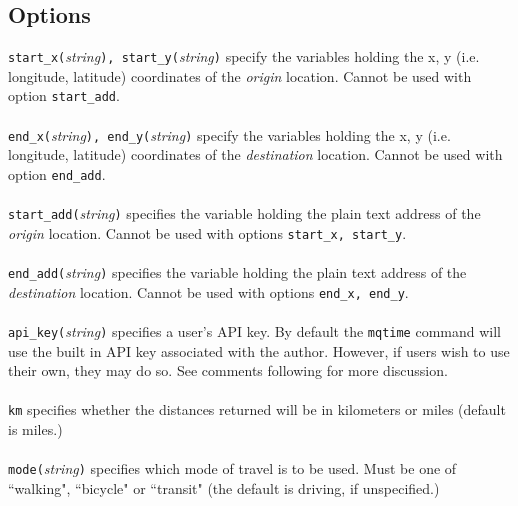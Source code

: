 \documentclass[11pt]{article}
\begin{document}
\subsection{Options}
\verb|start_x(|\textit{string}\verb|), start_y(|\textit{string}\verb|)| specify the variables holding the x, y (i.e. longitude, latitude) coordinates of the \textit{origin} location. Cannot be used with option \verb|start_add|.
\\ \\
\verb|end_x(|\textit{string}\verb|), end_y(|\textit{string}\verb|)| specify the variables holding the x, y (i.e. longitude, latitude) coordinates of the \textit{destination} location. Cannot be used with option \verb|end_add|.
\\ \\
\verb|start_add(|\textit{string}\verb|)| specifies the variable holding the plain text address of the \textit{origin} location. Cannot be used with options \verb|start_x, start_y|.
\\ \\
\verb|end_add(|\textit{string}\verb|)| specifies the variable holding the plain text address of the \textit{destination} location. Cannot be used with options \verb|end_x, end_y|.
\\ \\
\verb|api_key(|\textit{string}\verb|)| specifies a user's API key. By default the \verb|mqtime| command will use the built in API key associated with the author. However, if users wish to use their own, they may do so. See comments following for more discussion.
\\ \\
\verb|km| specifies whether the distances returned will be in kilometers or miles (default is miles.)
\\ \\
\verb|mode(|\textit{string}\verb|)| specifies which mode of travel is to be used. Must be one of ``walking", ``bicycle" or ``transit" (the default is driving, if unspecified.) 
\end{document}
